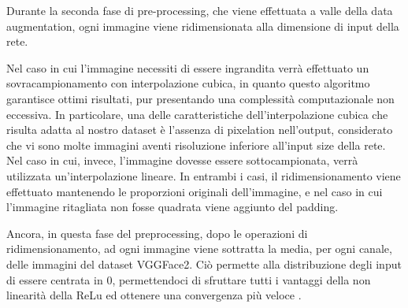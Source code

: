 Durante la seconda fase di pre-processing, che viene effettuata a valle della data augmentation, ogni immagine viene ridimensionata alla dimensione di input della rete.

Nel caso in cui l'immagine necessiti di essere ingrandita verrà effettuato un sovracampionamento con interpolazione cubica, in quanto questo algoritmo garantisce ottimi risultati, pur presentando una complessità computazionale non eccessiva. In particolare, una delle caratteristiche dell'interpolazione cubica che risulta adatta al nostro dataset è l'assenza di pixelation nell'output, considerato che vi sono molte immagini aventi risoluzione inferiore all'input size della rete.
Nel caso in cui, invece, l'immagine dovesse essere sottocampionata, verrà utilizzata un'interpolazione lineare. In entrambi i casi, il ridimensionamento viene effettuato mantenendo le proporzioni originali dell'immagine, e nel caso in cui l'immagine ritagliata non fosse quadrata viene aggiunto del padding. 

Ancora, in questa fase del preprocessing, dopo le operazioni di ridimensionamento, ad ogni immagine viene sottratta la media, per ogni canale, delle immagini del dataset VGGFace2. Ciò permette alla distribuzione degli input di essere centrata in $0$, permettendoci di sfruttare tutti i vantaggi della non linearità della ReLu ed ottenere una convergenza più veloce \cite{miviaage}.


